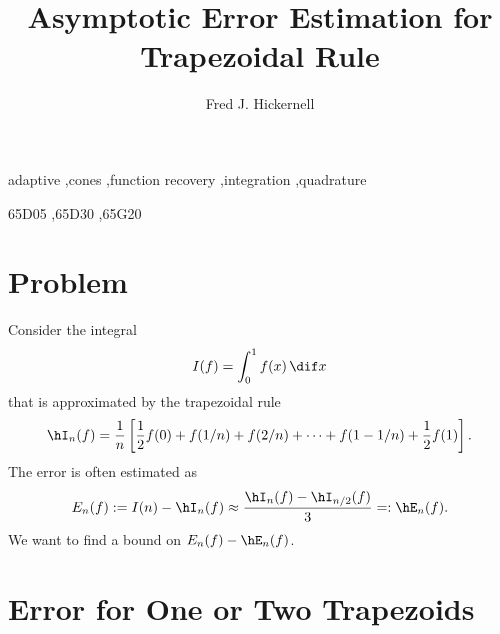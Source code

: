 \documentclass[]{elsarticle}
\theoremstyle{definition}
\theoremstyle{remark}
\begin{document}
\begin{frontmatter}

\title{Asymptotic Error Estimation for Trapezoidal Rule}
\author{Fred J. Hickernell}
\address{Room E1-208, Department of Applied Mathematics, Illinois Institute of Technology,\\ 10 W.\ 32$^{\text{nd}}$ St., Chicago, IL 60616}
\begin{abstract}
\end{abstract}

\begin{keyword}
adaptive \sep cones \sep function recovery \sep integration \sep quadrature

\MSC[2010] 65D05 \sep 65D30 \sep 65G20

\end{keyword}
\end{frontmatter}

\section{Problem}

Consider the integral 
\begin{equation*}
I(f)= \int_0^1 f(x) \, \dif x
\end{equation*}
that is approximated by the trapezoidal rule 
\begin{equation*}
\hI_n(f)= \frac{1}{n} \left[ \frac{1}{2}f(0) + f(1/n) + f(2/n) + \cdots +  f (1-1/n) + \frac{1}{2} f(1)\right].
\end{equation*}
The error is often estimated as 
\begin{equation*}
E_n(f) := I(n) - \hI_n(f) \approx \frac{\hI_n(f)-\hI_{n/2}(f)}{3} =: \hE_n(f).
\end{equation*}
We want to find a bound on $E_n(f)-\hE_n(f)$.


\section{Error for One or Two Trapezoids}
\end{document}
